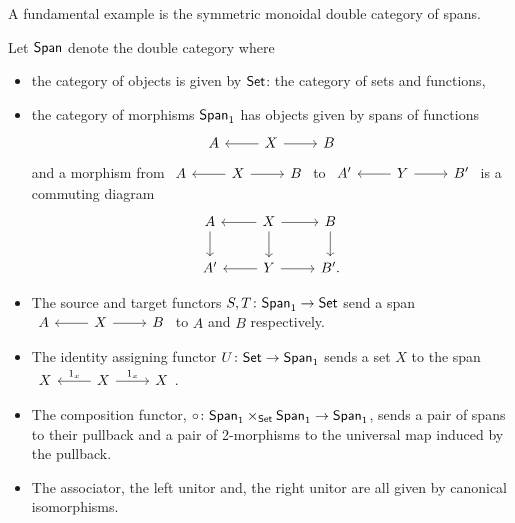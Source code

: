 \begin{defn}
    A fundamental example is the symmetric monoidal double category of spans.
    \begin{defn}\label{span}
    Let $\mathsf{Span}$ denote the double category where
\begin{itemize}
\item the category of objects is given by $\mathsf{Set}$: the category of sets and functions,
\item the category of morphisms $\mathsf{Span}_1$ has objects given by spans of functions
   \[\begin{tikzcd}A &\ar[l]X \ar[r] & B \end{tikzcd}\]
and a morphism from $\begin{tikzcd}A &\ar[l]X \ar[r] & B \end{tikzcd}$ to $\begin{tikzcd}A' &\ar[l]Y \ar[r] & B' \end{tikzcd}$ is a commuting diagram
    \[
    \begin{tikzcd}
        A\ar[d] & X \ar[r] \ar[d] \ar[l] & B \ar[d] \\
        A' & Y \ar[r] \ar[l] & B'.
    \end{tikzcd}
    \]
    \item The source and target functors $S,T \colon \mathsf{Span}_1 \to \mathsf{Set} $ send a span $\begin{tikzcd}A &\ar[l]X \ar[r] & B \end{tikzcd}$ to $A$ and $B$ respectively.
    \item The identity assigning functor $U\colon \mathsf{Set} \to \mathsf{Span}_1$ sends a set $X$ to the span $\begin{tikzcd}X &\ar[l,"1_x",swap]X \ar[r,"1_x"] & X \end{tikzcd}$.
    \item The composition functor, $\circ \colon \mathsf{Span}_1 \times_{\mathsf{Set}} \mathsf{Span}_1 \to \mathsf{Span}_1$, sends a pair of spans to their pullback and a pair of 2-morphisms to the universal map induced by the pullback.
    \item The associator, the left unitor and, the right unitor are all given by canonical isomorphisms.
\end{itemize} 
\end{defn}
\end{defn}
